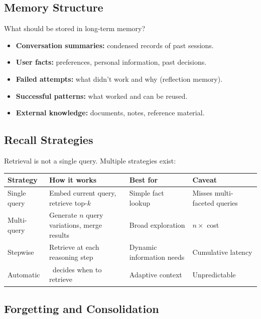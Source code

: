 \subsection{Memory Structure}

What should be stored in long-term memory?

\begin{itemize}
	\item \textbf{Conversation summaries:} condensed records of past sessions.
	\item \textbf{User facts:} preferences, personal information, past decisions.
	\item \textbf{Failed attempts:} what didn't work and why (reflection memory).
	\item \textbf{Successful patterns:} what worked and can be reused.
	\item \textbf{External knowledge:} documents, notes, reference material.
\end{itemize}

\subsection{Recall Strategies}

Retrieval is not a single query. Multiple strategies exist:

\begin{longtable}{p{3.5cm}p{4cm}p{4cm}p{3cm}}
	\toprule
	\textbf{Strategy} & \textbf{How it works}                        & \textbf{Best for}         & \textbf{Caveat}              \\
	\midrule
	Single query      & Embed current query, retrieve top-$k$        & Simple fact lookup        & Misses multi-faceted queries \\
	Multi-query       & Generate $n$ query variations, merge results & Broad exploration         & $n \times$ cost              \\
	Stepwise          & Retrieve at each reasoning step              & Dynamic information needs & Cumulative latency           \\
	Automatic         & \llm\ decides when to retrieve               & Adaptive context          & Unpredictable                \\
	\bottomrule
\end{longtable}

\subsection{Forgetting and Consolidation}

